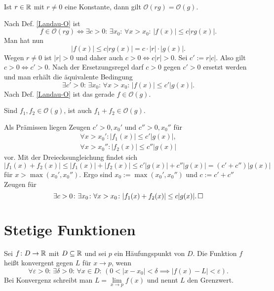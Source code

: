 \begin{Satz}
Ist $r\in\mathbb R$ mit $r\ne 0$ eine Konstante, dann gilt
$\mathcal O(rg)=\mathcal O(g)$.
\end{Satz}
\begin{Beweis}
Nach Def. \ref{Landau-O} ist
\[f\in\mathcal O(rg) \iff 
\exists c{>}0\colon\,\exists x_0\colon\,\forall x{>}x_0\colon\,|f(x)|\le c|rg(x)|.\]
Man hat nun
\[|f(x)|\le c|rg(x)| = c\cdot |r|\cdot |g(x)|.\]
Wegen $r\ne 0$ ist $|r|>0$ und daher auch $c>0\iff c|r|>0$. Sei
$c':=r|c|$. Also gilt $c>0\iff c'>0$. Nach der Ersetzungsregel
darf $c>0$ gegen $c'>0$ ersetzt werden und man erhält die
äquivalente Bedingung
\[\exists c'{>}0\colon\,\exists x_0\colon\,
\forall x{>}x_0\colon\,|f(x)|\le c'|g(x)|.\]
Nach Def. \ref{Landau-O} ist das gerade $f\in\mathcal O(g)$.\;\qedsymbol
\end{Beweis}

\begin{Satz}
Sind $f_1,f_2\in\mathcal O(g)$, ist auch $f_1+f_2\in\mathcal O(g)$.
\end{Satz}
\begin{Beweis}
Als Prämissen liegen Zeugen $c'>0,x_0'$ und $c''>0,x_0''$ für
\begin{gather*}
\forall x>x_0'\colon |f_1(x)|\le c'|g(x)|,\\
\forall x>x_0''\colon |f_2(x)|\le c''|g(x)|
\end{gather*}
vor. Mit der Dreiecksungleichung findet sich
\[|f_1(x)+f_2(x)|\le |f_1(x)|+|f_2(x)| \le c'|g(x)|+c''|g(x)| = (c'+c'')|g(x)|\]
für $x>\max(x_0',x_0'')$. Ergo sind $x_0:=\max(x_0',x_0'')$ und $c:=c'+c''$
Zeugen für
\[\exists c>0\colon\exists x_0\colon\forall x>x_0\colon |f_1(x)+f_2(x)|\le c|g(x)|.\,\square\]
\end{Beweis}

\newpage
\section{Stetige Funktionen}

\begin{Definition}\label{fn-lim}
Sei $f\colon D\to\mathbb R$ mit $D\subseteq\mathbb R$ und sei $p$ ein
Häufungspunkt von $D$. Die Funktion $f$ heißt konvergent
gegen $L$ für $x\to p$, wenn%
\[\forall \varepsilon{>}0\colon\,\exists \delta{>}0\colon\,\forall x{\in}D\colon\,
(0<|x-x_0|<\delta\implies |f(x)-L|<\varepsilon).\]
Bei Konvergenz schreibt man $L=\lim\limits_{x\to p} f(x)$ und nennt $L$ den Grenzwert.
\end{Definition}

